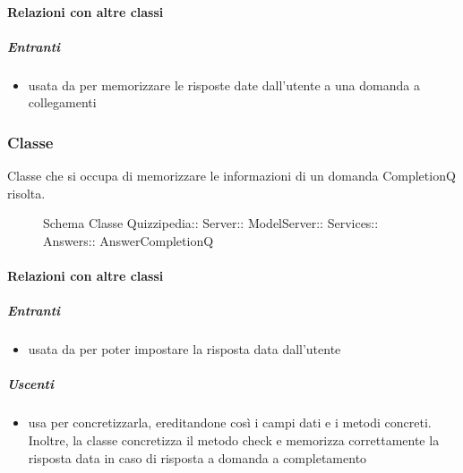\paragraph{Relazioni con altre classi}
\subparagraph{Entranti}
\begin{itemize}
\item usata da  per memorizzare le risposte date dall'utente a una domanda a collegamenti
\end{itemize}
\subsubsection{Classe }
Classe che si occupa di memorizzare le informazioni di un domanda CompletionQ risolta.
\begin{figure}[H]
\centering
\noindent{}
\caption[Schema Classe AnswerCompletionQ]{Schema Classe Quizzipedia:: Server:: ModelServer:: Services:: Answers:: AnswerCompletionQ}
\end{figure}
\paragraph{Relazioni con altre classi}
\subparagraph{Entranti}
\begin{itemize}
\item usata da  per poter impostare la risposta data dall'utente
\end{itemize}
\subparagraph{Uscenti}
\begin{itemize}
\item usa  per concretizzarla, ereditandone così i campi dati e i metodi concreti. Inoltre, la classe concretizza il metodo check e memorizza correttamente la risposta data in caso di risposta a domanda a completamento
\end{itemize}
